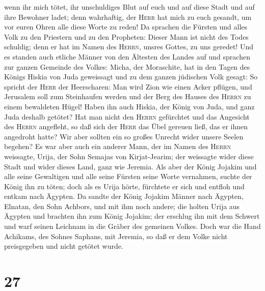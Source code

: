 wenn ihr mich tötet, ihr unschuldiges Blut auf euch und auf diese Stadt
und auf ihre Bewohner ladet; denn wahrhaftig, der \textsc{Herr} hat mich
zu euch gesandt, um vor euren Ohren alle diese Worte zu reden!
 Da sprachen die Fürsten und alles Volk zu den Priestern
und zu den Propheten: Dieser Mann ist nicht des Todes schuldig; denn er
hat im Namen des \textsc{Herrn}, unsres Gottes, zu uns geredet!
 Und es standen auch etliche Männer von den Ältesten des
Landes auf und sprachen zur ganzen Gemeinde des Volkes: 
Micha, der Moraschite, hat in den Tagen des Königs Hiskia von Juda
geweissagt und zu dem ganzen jüdischen Volk gesagt: So spricht der
\textsc{Herr} der Heerscharen: Man wird Zion wie einen Acker pflügen,
und Jerusalem soll zum Steinhaufen werden und der Berg des Hauses des
\textsc{Herrn} zu einem bewaldeten Hügel!  Haben ihn auch
Hiskia, der König von Juda, und ganz Juda deshalb getötet? Hat man nicht
den \textsc{Herrn} gefürchtet und das Angesicht des \textsc{Herrn}
angefleht, so daß sich der \textsc{Herr} das Übel gereuen ließ, das er
ihnen angedroht hatte? Wir aber sollten ein so großes Unrecht wider
unsere Seelen begehen?  Es war aber auch ein anderer
Mann, der im Namen des \textsc{Herrn} weissagte, Urija, der Sohn Semajas
von Kirjat-Jearim; der weissagte wider diese Stadt und wider dieses
Land, ganz wie Jeremia.  Als aber der König Jojakim und
alle seine Gewaltigen und alle seine Fürsten seine Worte vernahmen,
suchte der König ihn zu töten; doch als es Urija hörte, fürchtete er
sich und entfloh und entkam nach Ägypten.  Da sandte der
König Jojakim Männer nach Ägypten, Elnatan, den Sohn Achbors, und mit
ihm noch andere;  die holten Urija aus Ägypten und
brachten ihn zum König Jojakim; der erschlug ihn mit dem Schwert und
warf seinen Leichnam in die Gräber des gemeinen Volkes. 
Doch war die Hand Achikams, des Sohnes Saphans, mit Jeremia, so daß er
dem Volke nicht preisgegeben und nicht getötet wurde.

\hypertarget{section-26}{%
\section{27}\label{section-26}}

